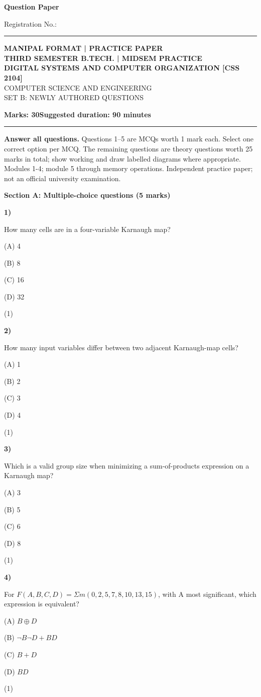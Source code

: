 \documentclass[11pt,a4paper]{article}
\newcommand{\question}[3]{\par\vspace{8pt}\noindent\begin{minipage}[t]{0.075\linewidth}\textbf{#1)}\end{minipage}\begin{minipage}[t]{0.855\linewidth}#3\end{minipage}\hfill\begin{minipage}[t]{0.055\linewidth}\raggedleft(#2)\end{minipage}\par}
\begin{document}
{\LARGE\bfseries Question Paper}\hfill {\small Registration No.: \rule{33mm}{0.3pt}}\par\vspace{8pt}
\begin{center}{\large\bfseries MANIPAL FORMAT | PRACTICE PAPER}\\[6pt]{\bfseries THIRD SEMESTER B.TECH. | MIDSEM PRACTICE}\\[4pt]{\bfseries DIGITAL SYSTEMS AND COMPUTER ORGANIZATION [CSS 2104]}\\[4pt]{\small COMPUTER SCIENCE AND ENGINEERING}\\[3pt]{\small SET B: NEWLY AUTHORED QUESTIONS}\end{center}
\textbf{Marks: 30}\hfill\textbf{Suggested duration: 90 minutes}\par\vspace{3pt}\hrule\vspace{5pt}
{\small\textbf{Answer all questions.} Questions 1--5 are MCQs worth 1 mark each. Select one correct option per MCQ. The remaining questions are theory questions worth 25 marks in total; show working and draw labelled diagrams where appropriate. Modules 1-4; module 5 through memory operations. Independent practice paper; not an official university examination.}\par
\medskip\textbf{Section A: Multiple-choice questions (5 marks)}\par
\question{1}{1}{How many cells are in a four-variable Karnaugh map?\par (A) 4\par (B) 8\par (C) 16\par (D) 32}
\question{2}{1}{How many input variables differ between two adjacent Karnaugh-map cells?\par (A) 1\par (B) 2\par (C) 3\par (D) 4}
\question{3}{1}{Which is a valid group size when minimizing a sum-of-products expression on a Karnaugh map?\par (A) 3\par (B) 5\par (C) 6\par (D) 8}
\question{4}{1}{For $F(A,B,C,D)=\Sigma m(0,2,5,7,8,10,13,15)$, with A most significant, which expression is equivalent?\par (A) $B\oplus D$\par (B) $\neg B\neg D+BD$\par (C) $B+D$\par (D) $BD$}
\end{document}
